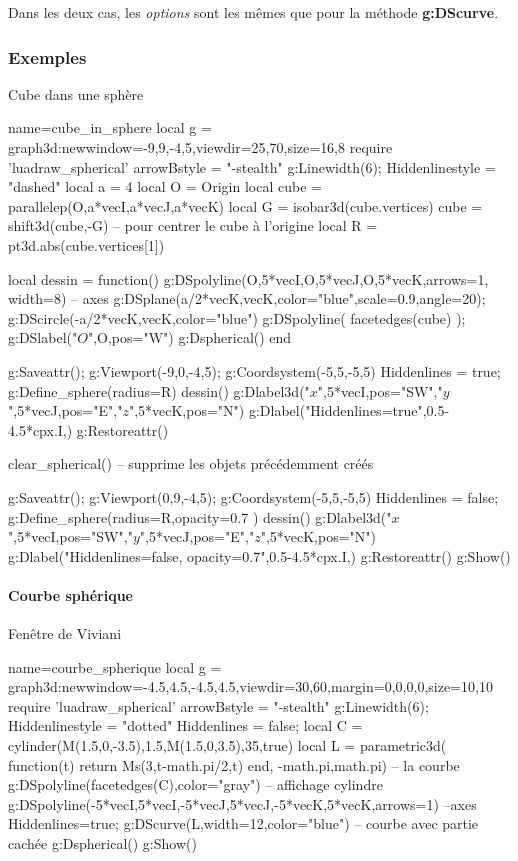 Dans les deux cas, les \emph{options} sont les mêmes que pour la méthode \textbf{g:DScurve}.

\subsubsection{Exemples}

\begin{demo}{Cube dans une sphère}
\begin{luadraw}{name=cube_in_sphere}
local g = graph3d:new{window={-9,9,-4,5},viewdir={25,70},size={16,8}}
require 'luadraw_spherical'
arrowBstyle = "-stealth"
g:Linewidth(6); Hiddenlinestyle = "dashed"
local a = 4
local O = Origin
local cube = parallelep(O,a*vecI,a*vecJ,a*vecK)
local G = isobar3d(cube.vertices)
cube = shift3d(cube,-G) -- pour centrer le cube à l'origine
local R = pt3d.abs(cube.vertices[1])

local dessin = function()
    g:DSpolyline({{O,5*vecI},{O,5*vecJ},{O,5*vecK}},{arrows=1, width=8}) -- axes
    g:DSplane({a/2*vecK,vecK},{color="blue",scale=0.9,angle=20}); 
    g:DScircle({-a/2*vecK,vecK},{color="blue"})
    g:DSpolyline( facetedges(cube) ); g:DSlabel("$O$",O,{pos="W"})
    g:Dspherical()
end

g:Saveattr(); g:Viewport(-9,0,-4,5); g:Coordsystem(-5,5,-5,5)
Hiddenlines = true; g:Define_sphere({radius=R})
dessin()
g:Dlabel3d("$x$",5*vecI,{pos="SW"},"$y$",5*vecJ,{pos="E"},"$z$",5*vecK,{pos="N"})
g:Dlabel("Hiddenlines=true",0.5-4.5*cpx.I,{})
g:Restoreattr()

clear_spherical() -- supprime les objets précédemment créés

g:Saveattr(); g:Viewport(0,9,-4,5); g:Coordsystem(-5,5,-5,5)
Hiddenlines = false; g:Define_sphere({radius=R,opacity=0.7} )
dessin()
g:Dlabel3d("$x$",5*vecI,{pos="SW"},"$y$",5*vecJ,{pos="E"},"$z$",5*vecK,{pos="N"})
g:Dlabel("Hiddenlines=false, opacity=0.7",0.5-4.5*cpx.I,{})
g:Restoreattr()
g:Show()
\end{luadraw}
\end{demo}

\paragraph{Courbe sphérique}

\begin{demo}{Fenêtre de Viviani}
\begin{luadraw}{name=courbe_spherique}
local g = graph3d:new{window={-4.5,4.5,-4.5,4.5},viewdir={30,60},margin={0,0,0,0},size={10,10}}
require 'luadraw_spherical'
arrowBstyle = "-stealth"
g:Linewidth(6); Hiddenlinestyle = "dotted"
Hiddenlines = false; 
local C = cylinder(M(1.5,0,-3.5),1.5,M(1.5,0,3.5),35,true)
local L = parametric3d( function(t) return Ms(3,t-math.pi/2,t) end, -math.pi,math.pi) -- la courbe
g:DSpolyline(facetedges(C),{color="gray"}) -- affichage cylindre
g:DSpolyline({{-5*vecI,5*vecI},{-5*vecJ,5*vecJ},{-5*vecK,5*vecK}},{arrows=1}) --axes
Hiddenlines=true; g:DScurve(L,{width=12,color="blue"}) -- courbe avec partie cachée
g:Dspherical()
g:Show()
\end{luadraw}
\end{demo}

